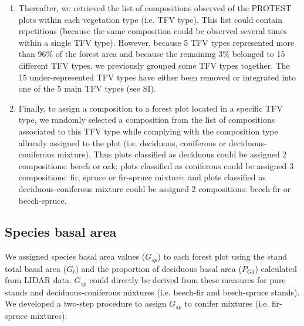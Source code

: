 \documentclass[a4paper]{article}
\begin{document}
\begin{enumerate}
    \item Thereafter, we retrieved the list of compositions observed of the PROTEST plots within each vegetation type (i.e. TFV type). This list could contain repetitions (because the same composition could be observed several times within a single TFV type). However, because 5 TFV types represented more than 96\% of the forest area and because the remaining 3\% belonged to 15 different TFV types, we previously grouped some TFV types together. The 15 under-represented TFV types have either been removed or integrated into one of the 5 main TFV types (see SI).

    \item Finally, to assign a composition to a forest plot located in a specific TFV type, we randomly selected a composition from the list of compositions associated to this TFV type while complying with the composition type allready assigned to the plot (i.e. deciduous, coniferous or deciduous-coniferous mixture). Thus plots classified as deciduous could be assigned 2 compositions: beech or oak; plots classified as coniferous could be assigned 3 compositions: fir, spruce or fir-spruce mixture; and plots classified as deciduous-coniferous mixture could be assigned 2 compositions: beech-fir or beech-spruce.

\end{enumerate}


\subsection*{Species basal area}

\noindent We assigned species basal area values ($G_{sp}$) to each forest plot using the stand total basal area ($G_t$) and the proportion of deciduous basal area ($P_{Gd}$) calculated from LIDAR data. $G_{sp}$ could directly be derived from these measures for pure stands and deciduous-coniferous mixtures (i.e. beech-fir and beech-spruce stands). We developed a two-step procedure to assign $G_{sp}$ to conifer mixtures (i.e. fir-spruce mixtures):
\end{document}

